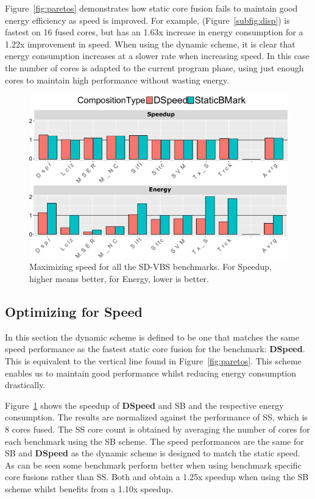 Figure~\ref{fig:paretos} demonstrates how static core fusion fails to maintain good energy efficiency as speed is improved.
For example,  (Figure~\ref{subfig:disp}) is fastest on 16 fused cores, but has an 1.63x increase in energy consumption for a 1.22x improvement in speed.
When using the dynamic scheme, it is clear that energy consumption increases at a slower rate when increasing speed.
In this case the number of cores is adapted to the current program phase, using just enough cores to maintain high performance without wasting energy.


\begin{figure}[t]
    \centering
	\includegraphics[width=1\textwidth]{cases-paper/graphics/results/speed_bars2.pdf}
    \caption{Maximizing speed for all the SD-VBS benchmarks. For Speedup, higher means better, for Energy, lower is better.}
    \label{fig:speedres}
	\vspace{1em}
\end{figure}

\subsection{Optimizing for Speed} \label{sec:dyn:speed}

In this section the dynamic scheme is defined to be one that matches the same speed performance as the fastest static core fusion for the benchmark: \textbf{DSpeed}.
This is equivalent to the vertical line found in Figure~\ref{fig:paretos}.
This scheme enables us to maintain good performance whilst reducing energy consumption drastically.

Figure~\ref{fig:speedres} shows the speedup of \textbf{DSpeed} and SB and the respective energy consumption.
The results are normalized against the performance of SS, which is 8 cores fused.
The SS core count is obtained by averaging the number of cores for each benchmark using the SB scheme. 
The speed performances are the same for SB and \textbf{DSpeed} as the dynamic scheme is designed to match the static speed.
As can be seen some benchmark perform better when using benchmark specific core fusions rather than SS.
Both  and  obtain a 1.25x speedup when using the SB scheme whilst  benefits from a 1.10x speedup.

